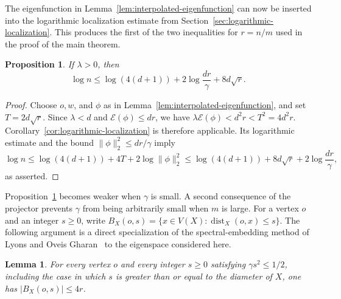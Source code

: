 \documentclass[11pt]{article}
\newtheorem{proposition}[theorem]{Proposition}
\newtheorem{lemma}[theorem]{Lemma}
\theoremstyle{definition}
\theoremstyle{remark}
\begin{document}
The eigenfunction in Lemma~\ref{lem:interpolated-eigenfunction} can now be inserted into the logarithmic localization estimate from Section~\ref{sec:logarithmic-localization}. This produces the first of the two inequalities for $r=n/m$ used in the proof of the main theorem.

\begin{proposition}\label{prop:localization-gap}
If $\lambda>0$, then
\[
\log n\leq\log(4(d+1))+2\log\frac{dr}{\gamma}+8d\sqrt r.
\]
\end{proposition}

\begin{proof}
Choose $o,w$, and $\phi$ as in Lemma~\ref{lem:interpolated-eigenfunction}, and set $T=2d\sqrt r$. Since $\lambda<d$ and $\mathcal E(\phi)\leq dr$, we have $\lambda\mathcal E(\phi)<d^2r<T^2=4d^2r$. Corollary~\ref{cor:logarithmic-localization} is therefore applicable. Its logarithmic estimate and the bound $\|\phi\|_2^2\leq dr/\gamma$ imply
\[
\log n\leq\log(4(d+1))+4T+2\log\|\phi\|_2^2
\leq\log(4(d+1))+8d\sqrt r+2\log\frac{dr}{\gamma},
\]
as asserted.
\end{proof}

Proposition~\ref{prop:localization-gap} becomes weaker when $\gamma$ is small. A second consequence of the projector prevents $\gamma$ from being arbitrarily small when $m$ is large. For a vertex $o$ and an integer $s\geq0$, write $B_X(o,s)=\{x\in V(X):\operatorname{dist}_X(o,x)\leq s\}$. The following argument is a direct specialization of the spectral-embedding method of Lyons and Oveis Gharan~\cite[Theorem~6.1]{LyonsOveisGharan2018SpectralEmbedding} to the eigenspace considered here.

\begin{lemma}\label{lem:projector-ball}
For every vertex $o$ and every integer $s\geq0$ satisfying $\gamma s^2\leq1/2$, including the case in which $s$ is greater than or equal to the diameter of $X$, one has $|B_X(o,s)|\leq4r$.
\end{lemma}
\end{document}
